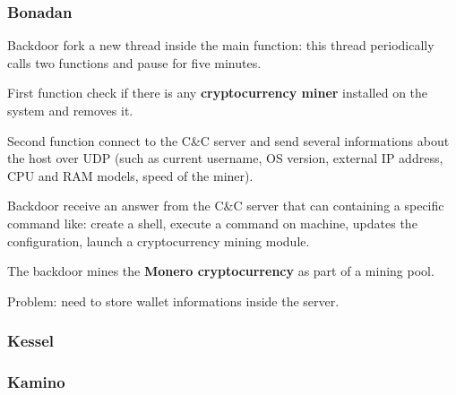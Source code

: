 \begin{frame}
	\frametitle{Bonadan}
	
	Backdoor fork a new thread inside the main function: this thread periodically calls two functions and pause for five minutes.
	
	\bigskip
	
	First function check if there is any \textbf{cryptocurrency miner} installed on the system and removes it.
	
	\bigskip
	
  Second function connect to the C\&C server and send several informations about the host over UDP (such as current username, OS version, external IP address, CPU and RAM models, speed of the miner).
  
	\bigskip
	
	Backdoor receive an answer from the C\&C server that can containing a specific command like: create a shell, execute a command on machine, updates the configuration, launch a cryptocurrency mining module.
	
	\bigskip
	
  The backdoor mines the \textbf{Monero cryptocurrency} as part of a mining pool.

	\bigskip
	
  Problem: need to store wallet informations inside the server.
  
\end{frame}
	


\begin{frame}
	\frametitle{Kessel}
\end{frame}


\begin{frame}
	\frametitle{Kamino}
\end{frame}
